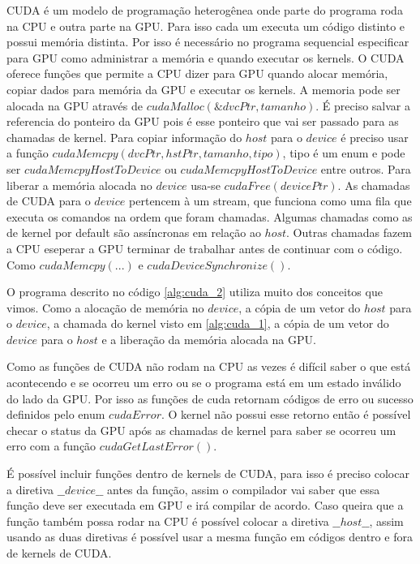 
CUDA é um modelo de programação heterogênea onde parte do programa roda na CPU e outra parte na GPU. Para isso cada um executa um código distinto e possui memória distinta. Por isso é necessário no programa sequencial especificar para GPU como administrar a memória e quando executar os kernels. O CUDA oferece funções que permite a CPU dizer para GPU quando alocar memória, copiar dados para memória da GPU e executar os kernels.
A memoria pode ser alocada na GPU através de $cudaMalloc(\&dvcPtr, tamanho)$. É preciso salvar a referencia do ponteiro da GPU pois é esse ponteiro que vai ser passado para as chamadas de kernel. Para copiar informação do $host$ para o $device$ é preciso usar a função $cudaMemcpy(dvcPtr, hstPtr, tamanho,  tipo)$, tipo é um enum e pode ser $cudaMemcpyHostToDevice$ ou $cudaMemcpyHostToDevice$ entre outros. Para liberar a memória alocada no $device$ usa-se $cudaFree(devicePtr)$. 
As chamadas de CUDA para o $device$ pertencem à um stream, que funciona como uma fila que executa os comandos na ordem que foram chamadas. Algumas chamadas como as de kernel por default são assíncronas em relação ao $host$. Outras chamadas fazem a CPU eseperar a GPU terminar de trabalhar antes de continuar com o código. Como $cudaMemcpy(...)$ e $cudaDeviceSynchronize()$.

O programa descrito no código \ref{alg:cuda_2} utiliza muito dos conceitos que vimos. Como a alocação de memória no $device$, a cópia de um vetor do $host$ para o $device$, a chamada do kernel visto em \ref{alg:cuda_1}, a cópia de um vetor do $device$ para o $host$ e a liberação da memória alocada na GPU.


Como as funções de CUDA não rodam na CPU as vezes é difícil saber o que está acontecendo e se ocorreu um erro ou se o programa está em um estado inválido do lado da GPU. Por isso as funções de cuda retornam códigos de erro ou sucesso definidos pelo enum $cudaError$. O kernel não possui esse retorno então é possível checar o status da GPU após as chamadas de kernel para saber se ocorreu um erro com a função $cudaGetLastError()$.

É possível incluir funções dentro de kernels de CUDA, para isso é preciso colocar a diretiva $\_\_device\_\_$ antes da função, assim o compilador vai saber que essa função deve ser executada em GPU e irá compilar de acordo. Caso queira que a função também possa rodar na CPU é possível colocar a diretiva $\_\_host\_\_$, assim usando as duas diretivas é possível usar a mesma função em códigos dentro e fora de kernels de CUDA.
